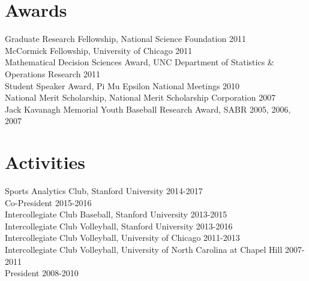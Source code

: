 \documentclass{article}
\begin{document}
\section*{\sc Awards}

Graduate Research Fellowship, National Science Foundation \hfill 2011\\
McCormick Fellowship, University of Chicago \hfill 2011\\
Mathematical Decision Sciences Award, UNC Department of Statistics \& Operations Research \hfill 2011\\
Student Speaker Award, Pi Mu Epsilon National Meetings \hfill 2010\\
National Merit Scholarship, National Merit Scholarship Corporation \hfill 2007\\
Jack Kavanagh Memorial Youth Baseball Research Award, SABR \hfill 2005, 2006, 2007

\section*{\sc Activities}

Sports Analytics Club, Stanford University \hfill 2014-2017\\
{\color{gray} \indent Co-President \hfill 2015-2016}\\
Intercollegiate Club Baseball, Stanford University \hfill 2013-2015\\
Intercollegiate Club Volleyball, Stanford University \hfill 2013-2016\\
Intercollegiate Club Volleyball, University of Chicago \hfill 2011-2013\\
Intercollegiate Club Volleyball, University of North Carolina at Chapel Hill \hfill 2007-2011\\
{\color{gray} \indent President \hfill 2008-2010}
\end{document}
